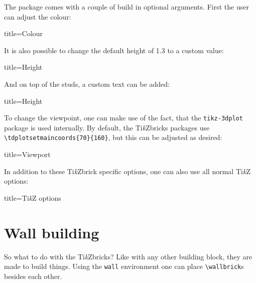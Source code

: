 \documentclass[parskip=half]{scrartcl}
\newcommand{\tikzbrick}{Ti\emph{k}Zbrick\xspace}
\begin{document}
The package comes with a couple of build in optional arguments. First the user can adjust the colour:
\begin{tcblisting}{title={Colour}}
\end{tcblisting}

It is also possible to change the default height of 1.3 to a custom value:
\begin{tcblisting}{title={Height}}
\end{tcblisting}

And on top of the studs, a custom text can be added:
\begin{tcblisting}{title={Height}}
\end{tcblisting}

To change the viewpoint, one can make use of the fact, that the \texttt{tikz-3dplot} package is used internally. By default, the \tikzbrick{}s packages use \lstinline|\tdplotsetmaincoords{70}{160}|, but this can be adjusted as desired:
\begin{tcblisting}{title={Viewport}}
\end{tcblisting}

In addition to these \tikzbrick specific options, one can also use all normal Ti\emph{k}Z options:
\begin{tcblisting}{title={Ti\emph{k}Z options}}
\end{tcblisting}

\section{Wall building}

So what to do with the \tikzbrick{}s? Like with any other building block, they are made to build things. Using the \lstinline|wall| environment one can place \lstinline|\wallbrick|s besides each other. 
\end{document}
